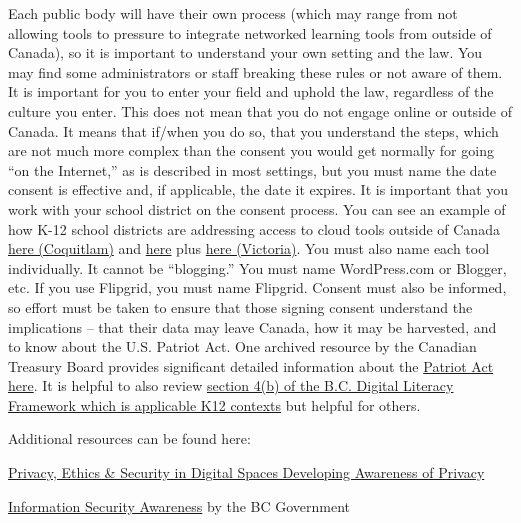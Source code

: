 \documentclass[
]{book}
\begin{document}
Each public body will have their own process (which may range from not allowing tools to pressure to integrate networked learning tools from outside of Canada), so it is important to understand your own setting and the law. You may find some administrators or staff breaking these rules or not aware of them. It is important for you to enter your field and uphold the law, regardless of the culture you enter. This does not mean that you do not engage online or outside of Canada. It means that if/when you do so, that you understand the steps, which are not much more complex than the consent you would get normally for going ``on the Internet,'' as is described in most settings, but you must name the date consent is effective and, if applicable, the date it expires. It is important that you work with your school district on the consent process. You can see an example of how K-12 school districts are addressing access to cloud tools outside of Canada \href{http://www.sd43.bc.ca/Resources/DigitalCitizenship/Pages/CloudTools.aspx}{here (Coquitlam)} and \href{https://www.sd61.bc.ca/programs/digital-learning/sd61-gafe/privacy-and-personal-information/}{here} plus \href{https://techforlearning.sd61.bc.ca/privacy/consent-process/}{here (Victoria)}. You must also name each tool individually. It cannot be ``blogging.'' You must name WordPress.com or Blogger, etc. If you use Flipgrid, you must name Flipgrid. Consent must also be informed, so effort must be taken to ensure that those signing consent understand the implications -- that their data may leave Canada, how it may be harvested, and to know about the U.S. Patriot Act. One archived resource by the Canadian Treasury Board provides significant detailed information about the \href{https://www.tbs-sct.gc.ca/pubs_pol/gospubs/TBM_128/usapa/faq-eng.asp}{Patriot Act here}. It is helpful to also review \href{https://www2.gov.bc.ca/assets/gov/education/kindergarten-to-grade-12/teach/teaching-tools/digital-literacy-framework.pdf}{section 4(b) of the B.C. Digital Literacy Framework which is applicable K12 contexts} but helpful for others.

Additional resources can be found here:

\href{https://digitaltattoo.ubc.ca/quizzes/privacy-and-surveillance}{Privacy, Ethics \& Security in Digital Spaces Developing Awareness of Privacy}

\href{https://www2.gov.bc.ca/gov/content/governments/services-for-government/information-management-technology/information-security/information-security-awareness}{Information Security Awareness} by the BC Government
\end{document}
